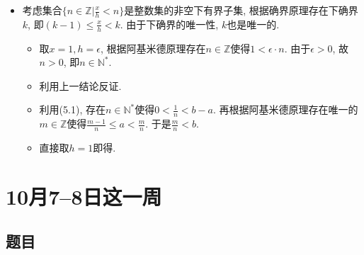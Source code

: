 \documentclass[UTF8,11pt, a4paper, oneside, fontset=none]{ctexbook}
\begin{document}
\begin{itemize}
\item[(5)] 考虑集合$\{ n \in \mathbb Z|\frac{x}{h} < n \}$是整数集的非空下有界子集, 根据确界原理存在下确界$k$, 即$(k-1) \leq \frac{x}{h} < k$. 由于下确界的唯一性, $k$也是唯一的.

\begin{itemize}
\item[(5.1)] 取$x=1, h = \epsilon$, 根据阿基米德原理存在$n \in \mathbb Z$使得$1 < \epsilon \cdot n$. 由于$\epsilon >0$, 故$n >0$, 即$n \in \mathbb N^*$.

\item[(5.2)] 利用上一结论反证.

\item[(5.3)] 利用(5.1), 存在$n \in \mathbb N^*$使得$0 < \frac{1}{n} < b-a$. 再根据阿基米德原理存在唯一的$m\in \mathbb Z$使得$\frac{m-1}{n} \leq a < \frac{m}{n}$. 于是$\frac{m}{n}<b$.

\item[(5.4)] 直接取$h=1$即得. 


\end{itemize}

\end{itemize}

\clearpage

\section{10月7--8日这一周}

\subsection*{题目}
\end{document}
